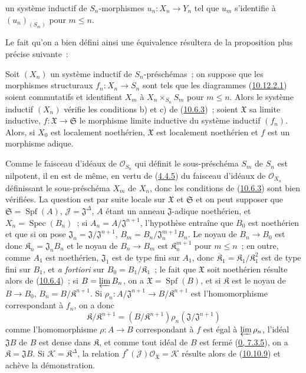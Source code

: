 
un système inductif de $S_n$-morphismes $u_n:X_n\to Y_n$ tel que $u_m$
s'identifie à $(u_n)_{(S_m)}$ pour $m\leq n$.

Le fait qu'on a bien défini ainsi une équivalence résultera de la proposition
plus précise suivante~:

\begin{proposition}[10.12.3.1]
\label{I.10.12.3.1-fr}
Soit $(X_n)$ un système inductif de $S_n$-préschémas~; on suppose que les
morphismes structuraux $f_n:X_n\to S_n$ sont tels que les diagrammes
(\hyperref[I.10.12.2.1-fr]{10.12.2.1}) soient commutatifs et identifient
$X_m$ à $X_n\times_{S_n}S_m$ pour $m\leq n$. Alors le système inductif
$(X_n)$ vérifie les conditions b) et c) de
(\hyperref[I.10.6.3-fr]{10.6.3})~; soient $\mathfrak{X}$ sa limite inductive,
$f:\mathfrak{X}\to\mathfrak{S}$ le morphisme limite inductive du système
inductif $(f_n)$. Alors, si $X_0$ est localement noethérien,
$\mathfrak{X}$ est localement noethérien et $f$ est un morphisme adique.
\end{proposition}

Comme le faisceau d'idéaux de $\mathscr{O}_{S_n}$ qui définit le
sous-préschéma $S_m$ de $S_n$ est nilpotent, il en est de même, en vertu de
(\hyperref[I.4.4.5-fr]{4.4.5}) du faisceau d'idéaux de
$\mathscr{O}_{X_n}$ définissant le sous-préschéma $X_m$ de $X_n$, donc les
conditions de (\hyperref[I.10.6.3-fr]{10.6.3}) sont bien vérifiées. La
question est par suite locale sur $\mathfrak{X}$ et $\mathfrak{S}$ et on
peut supposer que $\mathfrak{S}=\operatorname{Spf}(A)$,
$\mathscr{J}=\mathfrak{J}^\Delta$, $A$ étant un anneau $\mathfrak{J}$-adique
noethérien, et $X_n=\operatorname{Spec}(B_n)$~; si
$A_n=A/\mathfrak{J}^{n+1}$, l'hypothèse entraîne que $B_0$ est noethérien et
que si on pose $\mathfrak{J}_n=\mathfrak{J}/\mathfrak{J}^{n+1}$,
$B_m=B_n/\mathfrak{J}_n^{m+1}B_n$. Le noyau de $B_n\to B_0$ est donc
$\mathfrak{K}_n=\mathfrak{J}_nB_n$ et le noyau de $B_n\to B_m$ est
$\mathfrak{K}_n^{m+1}$ pour $m\leq n$~; en outre, comme $A_1$ est
noethérien, $\mathfrak{J}_1$ est de type fini sur $A_1$, donc
$\overline{\mathfrak{K}}_1=\mathfrak{K}_1/\mathfrak{K}_1^2$ est de type fini
sur $B_1$, et \emph{a fortiori} sur
$B_0=B_1/\mathfrak{K}_1$~; le fait que $\mathfrak{X}$ soit noethérien
résulte alors de (\hyperref[I.10.6.4-fr]{10.6.4})~; si
$B=\varprojlim B_n$, on a $\mathfrak{X}=\operatorname{Spf}(B)$, et si
$\mathfrak{K}$ est le noyau de $B\to B_0$,
$B_n=B/\mathfrak{K}^{n+1}$. Si
$\rho_n:A/\mathfrak{J}^{n+1}\to B/\mathfrak{K}^{n+1}$ est l'homomorphisme
correspondant à $f_n$, on a donc
\[
  \mathfrak{K}/\mathfrak{K}^{n+1}
  =(B/\mathfrak{K}^{n+1})\rho_n(\mathfrak{J}/\mathfrak{J}^{n+1})
\]
comme l'homomorphisme $\rho:A\to B$ correspondant à $f$ est égal à
$\varprojlim\rho_n$, l'idéal $\mathfrak{J}B$ de $B$ est dense dans
$\mathfrak{K}$, et comme tout idéal de $B$ est fermé
(\hyperref[0.7.3.5-fr]{0, 7.3.5}), on a $\mathfrak{K}=\mathfrak{J}B$. Si
$\mathscr{K}=\mathfrak{K}^\Delta$, la relation
$f^*(\mathscr{J})\mathscr{O}_{\mathfrak{X}}=\mathscr{K}$ résulte alors de
(\hyperref[I.10.10.9-fr]{10.10.9}) et achève la démonstration.

